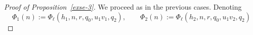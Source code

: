 \documentclass[12pt,a4paper,reqno]{amsart}
\numberwithin{equation}{section}
\theoremstyle{plain}
\newtheorem{proposition}[theorem]{Proposition}
\theoremstyle{definition}
\newcommand\eps{\varepsilon}
\renewcommand{\sim}{\asymp}
\renewcommand{\lessapprox}{\llcurly}
\begin{document}
\begin{proof}[Proof of Proposition~\ref{exse-3}]
We proceed as in the previous cases. Denoting
$$
\Phi_1(n):= \Phi_{\ell}(h_1,n, r,q_0,u_1v_1, q_2),\quad\quad \Phi_2(n):=
\Phi_{\ell}(h_2,n, r,q_0,u_1v_2,q_2)
$$
\end{proof}
\end{document}
